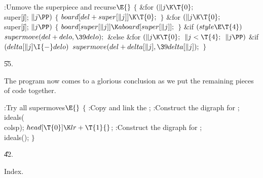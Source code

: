 \Y\B\4:Unmove the superpiece and recurse\X${}\E{}$\6
${}\{{}$\1\6
\&{for} ${}(\|j\K\T{0};{}$ \\{super}[\|j]; ${}\|j\PP){}$\5
${}\{{}$\1\6
${}\\{board}[\\{del}+\\{super}[\|j]]\K\T{0};{}$\6
\4${}\}{}$\2\6
\&{for} ${}(\|j\K\T{0};{}$ \\{super}[\|j]; ${}\|j\PP){}$\5
${}\{{}$\1\6
${}\\{board}[\\{super}[\|j]]\K\\{aboard}[\\{super}[\|j]];{}$\6
\4${}\}{}$\2\6
\&{if} ${}(\\{style}\E\T{4}){}$\1\5
${}\\{supermove}(\\{del}+\\{delo},\39\\{delo});{}$\2\6
\&{else}\1\6
\&{for} ${}(\|j\K\T{0};{}$ ${}\|j<\T{4};{}$ ${}\|j\PP){}$\1\6
\&{if} ${}(\\{delta}[\|j]\I{-}\\{delo}){}$\1\5
${}\\{supermove}(\\{del}+\\{delta}[\|j],\39\\{delta}[\|j]);{}$\2\2\2\6
\4${}\}{}$\2\par
\U55.\fi

The program now comes to a glorious conclusion as we put the remaining
pieces of code together.

\Y\B\4:Try all supermoves\X${}\E{}$\6
${}\{{}$\1\6
:Copy and link the \X;\6
:Construct the digraph for \X;\6
\\{ideals}(\\{colsp});\6
${}\\{head}[\T{0}]\K\\{lr}+\T{1}{}$;\6
:Construct the digraph for \X;\6
\\{ideals}();\6
\4${}\}{}$\2\par
\U42.\fi

Index.
\fi

\inx
\fin
\con
